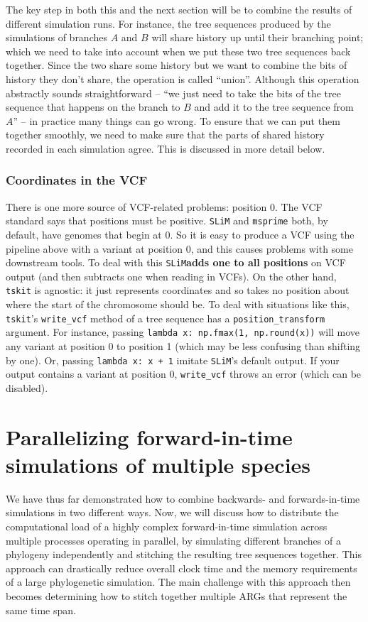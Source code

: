 \documentclass[12pt]{article}
\newcommand{\msprime}[0]{\texttt{msprime}\xspace}
\newcommand{\tskit}[0]{\texttt{tskit}\xspace}
\newcommand{\slim}[0]{\texttt{SLiM}\xspace}
\begin{document}
The key step in both this and the next section will be to combine the results of different simulation runs.
For instance, the tree sequences produced by the simulations of branches $A$ and $B$
will share history up until their branching point;
which we need to take into account when we put these two tree sequences back together.
Since the two share some history but we want to combine the bits of history they don't share,
the operation is called ``union''.
Although this operation abstractly sounds straightforward --
``we just need to take the bits of the tree sequence that happens on the branch to $B$
and add it to the tree sequence from $A$'' --
in practice many things can go wrong.
To ensure that we can put them together smoothly,
we need to make sure that the parts of shared history recorded in each simulation agree.
This is discussed in more detail below.

\subsubsection{Coordinates in the VCF}

There is one more source of VCF-related problems: position 0.
The VCF standard says that positions must be positive.
\slim and \msprime both, by default, have genomes that begin at 0.
So it is easy to produce a VCF using the pipeline above with a variant at position 0,
and this causes problems with some downstream tools.
To deal with this \slim \textbf{adds one to all positions} on VCF output
(and then subtracts one when reading in VCFs).
On the other hand, \tskit is agnostic: it just represents coordinates and so takes no position
about where the start of the chromosome should be.
To deal with situations like this, \tskit's \verb|write_vcf| method of a tree sequence
has a \verb|position_transform| argument.
For instance, passing \verb|lambda x: np.fmax(1, np.round(x))| will move any variant at position 0 to position 1
(which may be less confusing than shifting by one).
Or, passing \verb|lambda x: x + 1| imitate \slim's default output.
If your output contains a variant at position 0, \verb|write_vcf| throws an error
(which can be disabled).


\section{Parallelizing forward-in-time simulations of multiple species}

We have thus far demonstrated how to combine backwards- and forwards-in-time simulations
in two different ways.
Now, we will discuss how to distribute the computational load of a highly complex forward-in-time simulation across multiple processes operating in parallel,
by simulating different branches of a phylogeny independently
and stitching the resulting tree sequences together.
This approach can drastically reduce overall clock time and the memory requirements of a large phylogenetic simulation.
The main challenge with this approach then becomes
determining how to stitch together multiple ARGs that represent the same time span.
\end{document}
